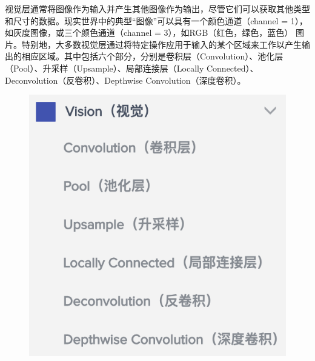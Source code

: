 \documentclass{progbookcn}
\begin{document}
视觉层通常将图像作为输入并产生其他图像作为输出，尽管它们可以获取其他类型和尺寸的数据。现实世界中的典型“图像”可以具有一个颜色通道（channel
= 1），如灰度图像，或三个颜色通道（channel = 3），如RGB（红色，绿色，蓝色） 图片。特别地，大多数视觉层通过将特定操作应用于输入的某个区域来工作以产生输出的相应区域。其中包括六个部分，分别是卷积层（Convolution）、池化层（Pool）、升采样（Upsample）、局部连接层（Locally Connected）、Deconvolution（反卷积）、Depthwise Convolution（深度卷积）。
\begin{figure}[H]
  \centering
  \includegraphics[scale = 0.6]{Vision_layer.png}
\end{figure}
\end{document}
